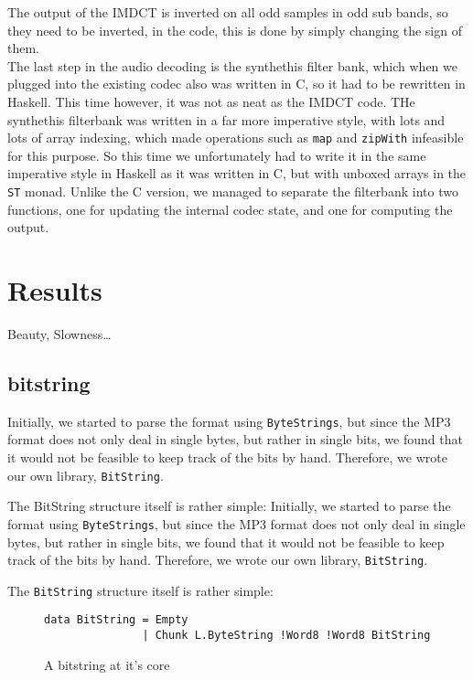 \documentclass[a4paper,12pt]{article}
\begin{document}
        The output of the IMDCT is inverted on all odd samples in odd sub bands,
        so they need to be inverted, in the code, this is done by simply
        changing the sign of them. \\

        The last step in the audio decoding is the synthethis filter bank, which
        when we plugged into the existing codec also was written in C, so it had
        to be rewritten in Haskell. This time however, it was not as neat as the
        IMDCT code. THe synthethis filterbank was written in a far more
        imperative style, with lots and lots of array indexing, which made
        operations such as \texttt{map} and \texttt{zipWith} infeasible for this
        purpose. So this time we unfortunately had to write it in the same
        imperative style in Haskell as it was written in C, but with unboxed
        arrays in the \texttt{ST} monad.  Unlike the C version, we managed to
        separate the filterbank into two functions, one for updating the
        internal codec state, and one for computing the output.

\section{Results}
    Beauty, Slowness\ldots
    \subsection{bitstring}
    \label{sec:bitstring}
        Initially, we started to parse the format using \texttt{ByteStrings},
        but since the MP3 format does not only deal in single bytes, but rather
        in single bits, we found that it would not be feasible to keep track of
        the bits by hand. Therefore, we wrote our own library,
        \texttt{BitString}.

        The BitString structure itself is rather simple:
        Initially, we started to parse the format using \texttt{ByteStrings},
        but since the MP3 format does not only deal in single bytes, but rather
        in single bits, we found that it would not be feasible to keep track of
        the bits by hand. Therefore, we wrote our own library,
        \texttt{BitString}.

        The \texttt{BitString} structure itself is rather simple:
\begin{figure}[h]
  \begin{center}
        \begin{lstlisting}
data BitString = Empty
               | Chunk L.ByteString !Word8 !Word8 BitString
        \end{lstlisting}
    \caption{A bitstring at it's core}\label{fig:bitstring}
  \end{center}
\end{figure}
\end{document}
